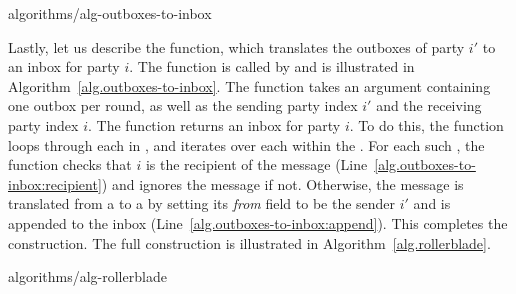 {algorithms/alg-outboxes-to-inbox}

Lastly, let us describe the \outboxesToInbox function, which translates the outboxes
of party $i'$ to an inbox for party $i$. The function is called by \prepareSimulationInputs
and is illustrated in Algorithm~\ref{alg.outboxes-to-inbox}. The function takes an
\outboxes argument containing one outbox per round, as well as the sending party index
$i'$ and the receiving party index $i$. The function returns an inbox for party $i$.
To do this, the function loops through each \outbox in \outboxes, and iterates over each
\netin within the \outbox. For each such \netout, the function checks that $i$ is the
recipient of the message (Line~\ref{alg.outboxes-to-inbox:recipient}) and ignores the
message if not. Otherwise, the message is translated from a \netout to a \netin
by setting its \emph{from} field to be the sender $i'$ and is
appended to the inbox (Line~\ref{alg.outboxes-to-inbox:append}).
This completes the construction. The full construction is illustrated in
Algorithm~\ref{alg.rollerblade}.

{algorithms/alg-rollerblade}

